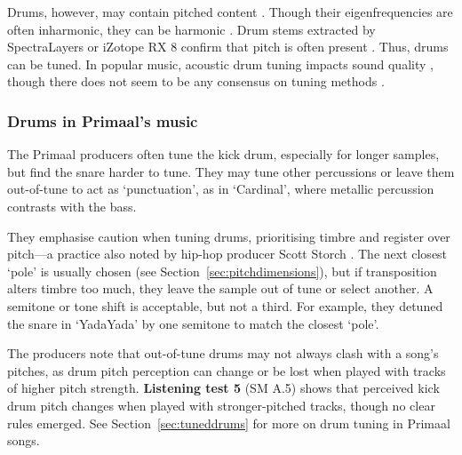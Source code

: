 \documentclass{article}
\begin{document}


Drums, however, may contain pitched content \citep{richardson2010acoustic}. Though their eigenfrequencies are often inharmonic, they can be harmonic \citep{antunes2017possible}. Drum stems extracted by SpectraLayers or iZotope RX 8 confirm that pitch is often present \citep[14'30, 19'41]{Attack2022}. Thus, drums can be tuned. In popular music, acoustic drum tuning impacts sound quality \citep{toulson2009perception}, though there does not seem to be any consensus on tuning methods \citep{drummagazine2010}. %



\subsubsection{Drums in Primaal's music}\label{sec:primaaldrums}


The Primaal producers often tune the kick drum, especially for longer samples, but find the snare harder to tune. They may tune other percussions or leave them out-of-tune to act as `punctuation', as in `Cardinal', where metallic percussion contrasts with the bass.

They emphasise caution when tuning drums, prioritising timbre and register over pitch---a practice also noted by hip-hop producer Scott Storch \citep{deruty2024storch}. The next closest `pole' is usually chosen (see Section~\ref{sec:pitchdimensions}), but if transposition alters timbre too much, they leave the sample out of tune or select another. A semitone or tone shift is acceptable, but not a third. For example, they detuned the snare in `YadaYada' by one semitone to match the closest `pole'.

The producers note that out-of-tune drums may not always clash with a song's pitches, as drum pitch perception can change or be lost when played with tracks of higher pitch strength. \textbf{Listening test 5} (SM A.5) shows that perceived kick drum pitch changes when played with stronger-pitched tracks, though no clear rules emerged. See Section~\ref{sec:tuneddrums} for more on drum tuning in Primaal songs.
\end{document}
